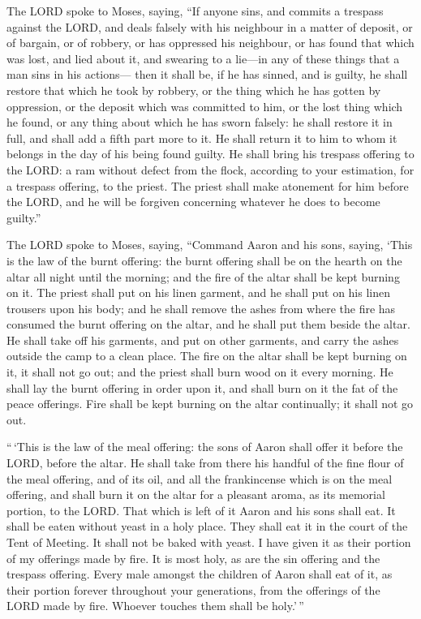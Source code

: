  The LORD spoke to Moses, saying,  ``If anyone
sins, and commits a trespass against the LORD, and deals falsely with
his neighbour in a matter of deposit, or of bargain, or of robbery, or
has oppressed his neighbour,  or has found that which was
lost, and lied about it, and swearing to a lie---in any of these things
that a man sins in his actions---  then it shall be, if he
has sinned, and is guilty, he shall restore that which he took by
robbery, or the thing which he has gotten by oppression, or the deposit
which was committed to him, or the lost thing which he found,
 or any thing about which he has sworn falsely: he shall
restore it in full, and shall add a fifth part more to it. He shall
return it to him to whom it belongs in the day of his being found
guilty.  He shall bring his trespass offering to the LORD: a
ram without defect from the flock, according to your estimation, for a
trespass offering, to the priest.  The priest shall make
atonement for him before the LORD, and he will be forgiven concerning
whatever he does to become guilty.''

 The LORD spoke to Moses, saying,  ``Command
Aaron and his sons, saying, `This is the law of the burnt offering: the
burnt offering shall be on the hearth on the altar all night until the
morning; and the fire of the altar shall be kept burning on it.
 The priest shall put on his linen garment, and he shall
put on his linen trousers upon his body; and he shall remove the ashes
from where the fire has consumed the burnt offering on the altar, and he
shall put them beside the altar.  He shall take off his
garments, and put on other garments, and carry the ashes outside the
camp to a clean place.  The fire on the altar shall be kept
burning on it, it shall not go out; and the priest shall burn wood on it
every morning. He shall lay the burnt offering in order upon it, and
shall burn on it the fat of the peace offerings.  Fire
shall be kept burning on the altar continually; it shall not go out.

 ``\,`This is the law of the meal offering: the sons of
Aaron shall offer it before the LORD, before the altar.  He
shall take from there his handful of the fine flour of the meal
offering, and of its oil, and all the frankincense which is on the meal
offering, and shall burn it on the altar for a pleasant aroma, as its
memorial portion, to the LORD.  That which is left of it
Aaron and his sons shall eat. It shall be eaten without yeast in a holy
place. They shall eat it in the court of the Tent of Meeting.
 It shall not be baked with yeast. I have given it as their
portion of my offerings made by fire. It is most holy, as are the sin
offering and the trespass offering.  Every male amongst the
children of Aaron shall eat of it, as their portion forever throughout
your generations, from the offerings of the LORD made by fire. Whoever
touches them shall be holy.'\,''

